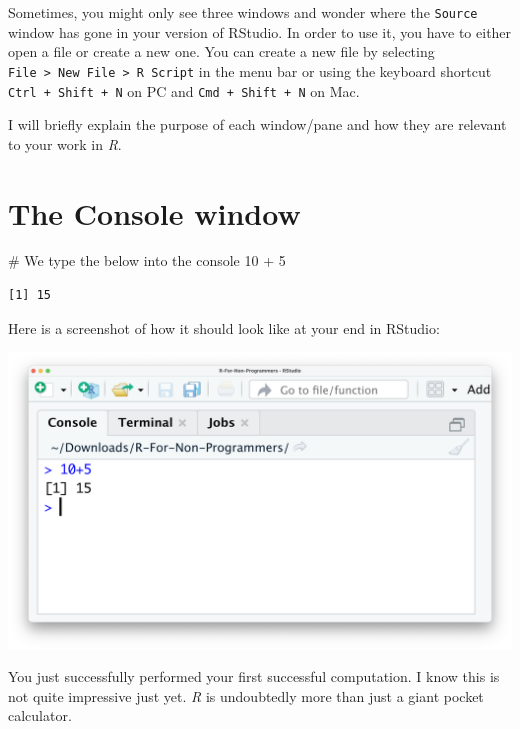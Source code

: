 \documentclass[
  letterpaper,
]{krantz}
\makeatletter
\newenvironment{Shaded}{\begin{snugshade}}{\end{snugshade}}
\newcommand{\CommentTok}[1]{\textcolor[rgb]{0.37,0.37,0.37}{#1}}
\newcommand{\DecValTok}[1]{\textcolor[rgb]{0.68,0.00,0.00}{#1}}
\newcommand{\SpecialCharTok}[1]{\textcolor[rgb]{0.37,0.37,0.37}{#1}}
\newenvironment{kframe}{%
\medskip{}
\setlength{\fboxsep}{.8em}
 \def\at@end@of@kframe{}%
 \ifinner\ifhmode%
  \def\at@end@of@kframe{\end{minipage}}%
  \begin{minipage}{\columnwidth}%
 \fi\fi%
 \def\FrameCommand##1{\hskip\@totalleftmargin \hskip-\fboxsep
 \colorbox{shadecolor}{##1}\hskip-\fboxsep
     \hskip-\linewidth \hskip-\@totalleftmargin \hskip\columnwidth}%
 \MakeFramed {\advance\hsize-\width
   \@totalleftmargin\z@ \linewidth\hsize
   \@setminipage}}%
 {\par\unskip\endMakeFramed%
 \at@end@of@kframe}
\renewenvironment{Shaded}{\begin{kframe}}{\end{kframe}}
\makeatother
\begin{document}
Sometimes, you might only see three windows and wonder where the
\texttt{Source} window has gone in your version of RStudio. In order to
use it, you have to either open a file or create a new one. You can
create a new file by selecting
\texttt{File\ \textgreater{}\ New\ File\ \textgreater{}\ R\ Script} in
the menu bar or using the keyboard shortcut
\texttt{Ctrl\ +\ Shift\ +\ N} on PC and \texttt{Cmd\ +\ Shift\ +\ N} on
Mac.

I will briefly explain the purpose of each window/pane and how they are
relevant to your work in \emph{R}.

\section{The Console window}\label{sec-the-console-window}

\begin{Shaded}
\begin{Highlighting}[]
\CommentTok{\# We type the below into the console}
\DecValTok{10} \SpecialCharTok{+} \DecValTok{5}
\end{Highlighting}
\end{Shaded}

\begin{verbatim}
[1] 15
\end{verbatim}

Here is a screenshot of how it should look like at your end in RStudio:

\includegraphics{images/chapter_04_img/02_console_window/console_algebra.png}

You just successfully performed your first successful computation. I
know this is not quite impressive just yet. \emph{R} is undoubtedly more
than just a giant pocket calculator.
\end{document}
